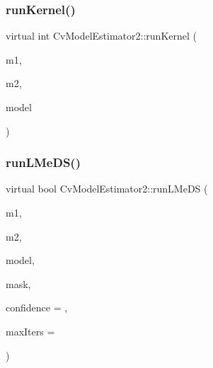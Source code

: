 \subsubsection{\texorpdfstring{run\+Kernel()}{runKernel()}}
{\footnotesize\ttfamily virtual int Cv\+Model\+Estimator2\+::run\+Kernel (\begin{DoxyParamCaption}\item[{const Cv\+Mat $\ast$}]{m1,  }\item[{const Cv\+Mat $\ast$}]{m2,  }\item[{Cv\+Mat $\ast$}]{model }\end{DoxyParamCaption})\hspace{0.3cm}{\ttfamily [pure virtual]}}

\mbox{\label{class_cv_model_estimator2_a15486b3aea44ad7247924dd1532ce5a8}} 
\subsubsection{\texorpdfstring{run\+L\+Me\+D\+S()}{runLMeDS()}}
{\footnotesize\ttfamily virtual bool Cv\+Model\+Estimator2\+::run\+L\+Me\+DS (\begin{DoxyParamCaption}\item[{const Cv\+Mat $\ast$}]{m1,  }\item[{const Cv\+Mat $\ast$}]{m2,  }\item[{Cv\+Mat $\ast$}]{model,  }\item[{Cv\+Mat $\ast$}]{mask,  }\item[{double}]{confidence = {},  }\item[{int}]{max\+Iters = {} }\end{DoxyParamCaption})\hspace{0.3cm}{\ttfamily [virtual]}}

\mbox{\label{class_cv_model_estimator2_af44a8168c5416e210819c7eea380ac66}} 
